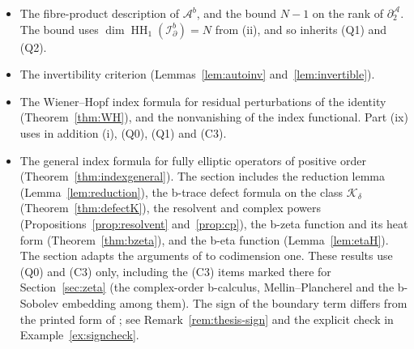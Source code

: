 \documentclass[11pt,oneside,reqno]{article}
\DeclareMathOperator{\HH}{HH}
\newcommand{\Idb}{\mathcal I^b_\partial}
\newcommand{\Ab}{\mathcal A^b}
\newcommand{\Adb}{\mathcal A^b_\partial}
\theoremstyle{plain}
\theoremstyle{definition}
\theoremstyle{remark}
\begin{document}
\begin{itemize}
\(\Adb\) and of \(\partial^{\mathcal A}_1\), by explicit test cycles. The
identification of connecting maps uses (Q1).
\item The fibre-product description of \(\Ab\), and the bound \(N-1\) on the
rank of \(\partial^{\mathcal A}_2\). The bound uses
\(\dim\HH_1(\Idb)=N\) from (ii), and so inherits (Q1) and (Q2).
\item The invertibility criterion (Lemmas~\ref{lem:autoinv}
and~\ref{lem:invertible}).
\item The Wiener--Hopf index formula for residual perturbations of the
identity (Theorem~\ref{thm:WH}), and the nonvanishing of the index
functional. Part (ix) uses in addition (i), (Q0), (Q1) and (C3).
\item The general index formula for fully elliptic operators of positive
order (Theorem~\ref{thm:indexgeneral}). The section includes the reduction lemma (Lemma~\ref{lem:reduction}), the b-trace defect formula on the
class \(\mathcal K_\delta\) (Theorem~\ref{thm:defectK}), the resolvent and
complex powers (Propositions~\ref{prop:resolvent} and~\ref{prop:cp}), the
b-zeta function and its heat form (Theorem~\ref{thm:bzeta}), and the
b-eta function (Lemma~\ref{lem:etaH}). The section adapts the arguments of
\cite[Chs.~2--8]{LoyaThesis} to codimension one. These results use (Q0) and (C3)
only, including the (C3) items marked there for Section~\ref{sec:zeta}
(the complex-order b-calculus, Mellin--Plancherel and the b-Sobolev
embedding among them). The
sign of the boundary term differs from the printed form of
\cite[Thm.~8.6]{LoyaThesis}; see Remark~\ref{rem:thesis-sign} and the explicit
check in Example~\ref{ex:signcheck}.
\end{itemize}
\end{document}
